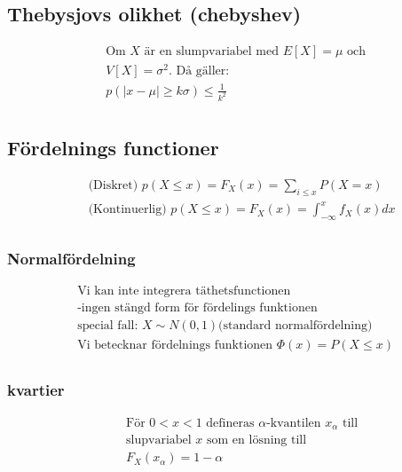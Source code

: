 \begin{multicols}{2}
\subsection{Thebysjovs olikhet (chebyshev)}
\begin{align*}
  &\text{Om $X$ är en slumpvariabel med $E[X]=\mu$ och} \\
  &V[X]=\sigma^2. \text{ Då gäller:} \\
  &p(|x-\mu| \geq{k\sigma}) \leq \frac{1}{k^2} \\
\end{align*}

\subsection{Fördelnings functioner}
\begin{align*}
  &\quad  \text{(Diskret) }      p(X\leq{x}) = F_X(x) = \sum_{i\leq{x}} P(X=x) \\
  &\quad  \text{(Kontinuerlig) } p(X\leq{x}) = F_X(x) =  \int_{-\infty}^{x} f_X(x)dx \\
\end{align*}

\subsubsection{Normalfördelning}
\begin{align*}
  &\text{Vi kan inte integrera täthetsfunctionen} \\
  &\text{-ingen stängd form för fördelings funktionen} \\
  &\text{special fall: } X\sim{N(0,1)} \text{(standard normalfördelning)} \\
  &\text{Vi betecknar fördelnings funktionen } \Phi(x) = P(X\leq{x}) \\
\end{align*}

\subsubsection{kvartier}
\begin{align*}
  &\quad  \text{För $0<x<1$ defineras $\alpha$-kvantilen $x_{\alpha}$ till} \\
  &\quad  \text{slupvariabel $x$ som en lösning till } \\
  &\quad  F_X(x_\alpha) = 1-\alpha \\
\end{align*}


\end{multicols}
